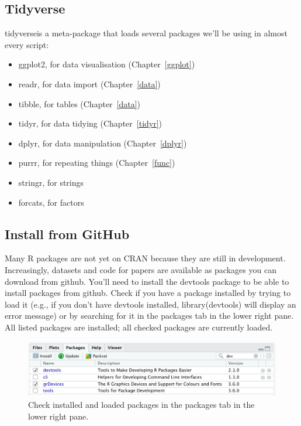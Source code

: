 \documentclass[
  oneside]{book}
\providecommand{\tightlist}{%
  \setlength{\itemsep}{0pt}\setlength{\parskip}{0pt}}
\begin{document}
\hypertarget{tidyverse}{%
\subsection{Tidyverse}\label{tidyverse}}

tidyverseis a meta-package that loads several packages we'll be using in almost every script:

\begin{itemize}
\tightlist
\item
  ggplot2, for data visualisation (Chapter~\ref{ggplot})
\item
  readr, for data import (Chapter~\ref{data})
\item
  tibble, for tables (Chapter~\ref{data})
\item
  tidyr, for data tidying (Chapter~\ref{tidyr})
\item
  dplyr, for data manipulation (Chapter~\ref{dplyr})
\item
  purrr, for repeating things (Chapter~\ref{func})
\item
  stringr, for strings
\item
  forcats, for factors
\end{itemize}

\hypertarget{install-from-github}{%
\subsection{Install from GitHub}\label{install-from-github}}

Many R packages are not yet on CRAN because they are still in development. Increasingly, datasets and code for papers are available as packages you can download from github. You'll need to install the devtools package to be able to install packages from github. Check if you have a package installed by trying to load it (e.g., if you don't have devtools installed, {library}{(}{devtools}{)} will display an error message) or by searching for it in the packages tab in the lower right pane. All listed packages are installed; all checked packages are currently loaded.

\begin{figure}

{\centering \includegraphics[width=1\linewidth]{images/intro/packages} 

}

\caption{Check installed and loaded packages in the packages tab in the lower right pane.}\label{fig:img-packages}
\end{figure}
\end{document}
